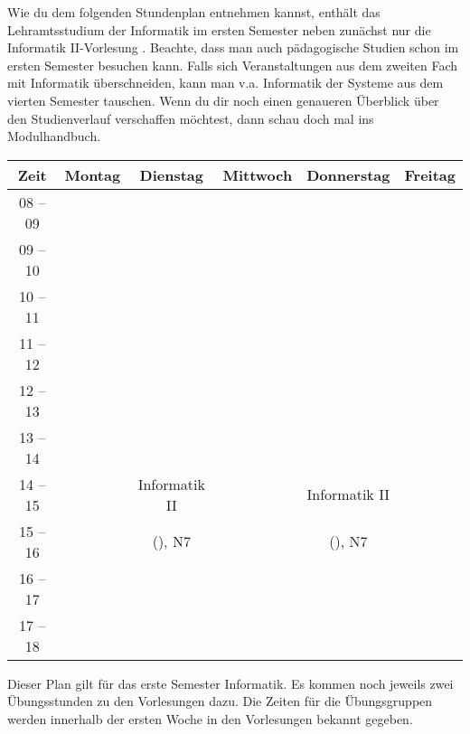 Wie du dem folgenden Stundenplan entnehmen kannst, enthält das Lehramtsstudium der Informatik im ersten Semester neben zunächst nur die Informatik II-Vorlesung . %
Beachte, dass man auch pädagogische Studien schon im ersten Semester besuchen kann. Falls sich Veranstaltungen aus dem zweiten
Fach mit Informatik überschneiden, kann man v.a. Informatik der Systeme aus dem vierten Semester tauschen.
Wenn du dir noch einen genaueren Überblick über den Studienverlauf verschaffen möchtest, dann schau doch mal ins Modulhandbuch.

\begin{center}
	\begin{tabular}{|c|c|c|c|c|c|} \hline
		Zeit      & 			Montag 		& Dienstag			& Mittwoch 			& Donnerstag 			& Freitag	 \\
		\hline\hline
		08 -- 09  & 						&  					& 					&  						&			\\
		\hline
		09 -- 10  & 						 & 					& 					  &  					&			\\
		\hline
		10 -- 11  &	&					&					&						&			\\
		\cline{1-1}\cline{3-6}
		11 -- 12 & 	&  					&					&			 			& 			\\
		\hline
		12 -- 13 & 							& 				 	& 				    & 						& 			 \\
		\hline
		13 -- 14 & 							& 					& 	& 						& 			 \\
		\hline
		14 -- 15 & 							& Informatik II 		& 					& Informatik II 			& 				\\
		\cline{1-2}\cline{4-4}\cline{6-6}
		15 -- 16 &							 & (\Infoprof), N7 	& 					& (\Infoprof), N7 		& 				\\
		\hline
		16 -- 17 & & & & &\\
		\hline
		17 -- 18 & & & & & \\
		\hline
	\end{tabular}


\end{center}

Dieser Plan gilt für das erste Semester Informatik. Es kommen noch jeweils zwei Übungsstunden zu den Vorlesungen dazu.
Die Zeiten für die Übungsgruppen werden innerhalb der ersten Woche in den Vorlesungen bekannt gegeben. \\
